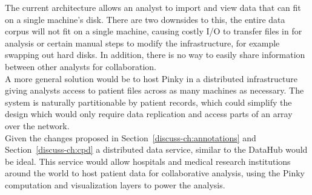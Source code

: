 The current architecture allows an analyst to import and view data that can fit
on a single machine's disk. There are two downsides to this, the entire data
corpus will not fit on a single machine, causing costly I/O to
transfer files in for analysis or certain manual steps to modify the
infrastructure, for example swapping out hard disks. In addition, there is no
way to easily share information between other analysts for collaboration. \\

A more general solution would be to host Pinky in a distributed infrastructure
giving analysts access to patient files across as many machines as necessary.
The system is naturally partitionable by patient records, which could simplify
the design which would only require data replication and access parts of
an array over the network. \\

Given the changes proposed in Section~\ref{discuss-ch:annotations} and
Section~\ref{discuss-ch:cpd} a distributed data service, similar to the
DataHub \cite{datahub} would be ideal. This service would allow hospitals and
medical research institutions around the world to host patient data for
collaborative analysis, using the Pinky computation and visualization layers to
power the analysis.

